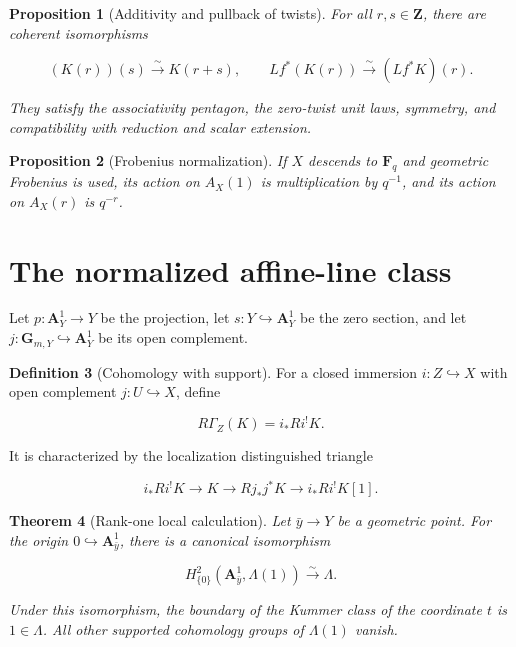 \documentclass[10pt]{article}
\newtheorem{theorem}{Theorem}[section]
\newtheorem{proposition}[theorem]{Proposition}
\theoremstyle{definition}
\newtheorem{definition}[theorem]{Definition}
\begin{document}
\begin{proposition}[Additivity and pullback of twists]
For all \(r,s\in\mathbf Z\), there are coherent isomorphisms

\[
 (K(r))(s)\xrightarrow{\sim}K(r+s),
 \qquad
 Lf^*(K(r))\xrightarrow{\sim}(Lf^*K)(r).
\]

They satisfy the associativity pentagon, the zero-twist unit laws, symmetry,
and compatibility with reduction and scalar extension.
\end{proposition}

\begin{proposition}[Frobenius normalization]
If \(X\) descends to \(\mathbf F_q\) and geometric Frobenius is used, its
action on \(A_X(1)\) is multiplication by \(q^{-1}\), and its action on
\(A_X(r)\) is \(q^{-r}\).
\end{proposition}

\section{The normalized affine-line class}

Let \(p:\mathbf A^1_Y\to Y\) be the projection, let
\(s:Y\hookrightarrow\mathbf A^1_Y\) be the zero section, and let
\(j:\mathbf G_{m,Y}\hookrightarrow\mathbf A^1_Y\) be its open complement.

\begin{definition}[Cohomology with support]
For a closed immersion \(i:Z\hookrightarrow X\) with open complement
\(j:U\hookrightarrow X\), define

\[
 R\Gamma_Z(K)=i_*Ri^!K.
\]

It is characterized by the localization distinguished triangle

\[
 i_*Ri^!K\longrightarrow K\longrightarrow Rj_*j^*K
 \longrightarrow i_*Ri^!K[1].
\]
\end{definition}

\begin{theorem}[Rank-one local calculation]
Let \(\bar y\to Y\) be a geometric point.  For the origin
\(0\hookrightarrow\mathbf A^1_{\bar y}\), there is a canonical isomorphism

\[
 H^2_{\{0\}}(\mathbf A^1_{\bar y},\Lambda(1))\xrightarrow{\sim}\Lambda.
\]

Under this isomorphism, the boundary of the Kummer class of the coordinate
\(t\) is \(1\in\Lambda\).  All other supported cohomology groups of
\(\Lambda(1)\) vanish.
\end{theorem}
\end{document}
